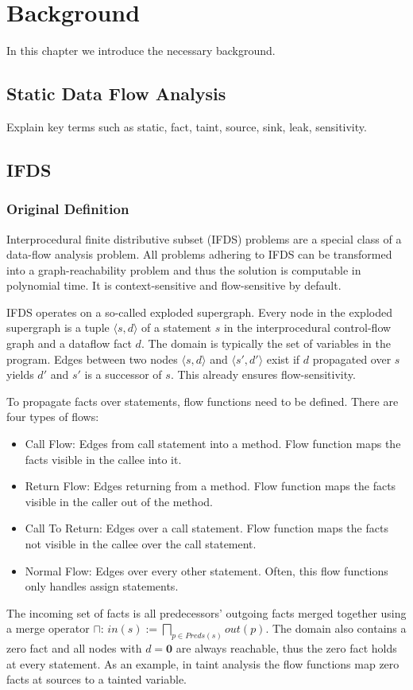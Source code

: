 \documentclass[../draft.tex]{subfiles}
\begin{document}
    \chapter{Background}
    In this chapter we introduce the necessary background.

    \section{Static Data Flow Analysis}
    Explain key terms such as static, fact, taint, source, sink, leak, sensitivity.
    
    \section{IFDS}
    \subsection{Original Definition}
    Interprocedural finite distributive subset (IFDS) problems are a special class of a data-flow analysis problem. All problems adhering to IFDS can be transformed into a graph-reachability problem and thus the solution is computable in polynomial time. It is context-sensitive and flow-sensitive by default.

    IFDS operates on a so-called exploded supergraph. Every node in the exploded supergraph is a tuple $\langle s, d \rangle$ of a statement $s$ in the interprocedural control-flow graph and a dataflow fact $d$. The domain is typically the set of variables in the program. Edges between two nodes $\langle s, d \rangle$ and $\langle s', d' \rangle$ exist if $d$ propagated over $s$ yields $d'$ and $s'$ is a successor of $s$. This already ensures flow-sensitivity.

    To propagate facts over statements, flow functions need to be defined. There are four types of flows:
    \begin{itemize}
        \item Call Flow: Edges from call statement into a method. Flow function maps the facts visible in the callee into it. 
        \item Return Flow: Edges returning from a method. Flow function maps the facts visible in the caller out of the method.
        \item Call To Return: Edges over a call statement. Flow function maps the facts not visible in the callee over the call statement.
        \item Normal Flow: Edges over every other statement. Often, this flow functions only handles assign statements.
    \end{itemize}
    The incoming set of facts is all predecessors' outgoing facts merged together using a merge operator $\sqcap$: $in(s) := \bigsqcap_{p \in Preds(s)} out(p)$.
    The domain also contains a zero fact and all nodes with $d=\textbf{0}$ are always reachable, thus the zero fact holds at every statement. As an example, in taint analysis the flow functions map zero facts at sources to a tainted variable. 
\end{document}
